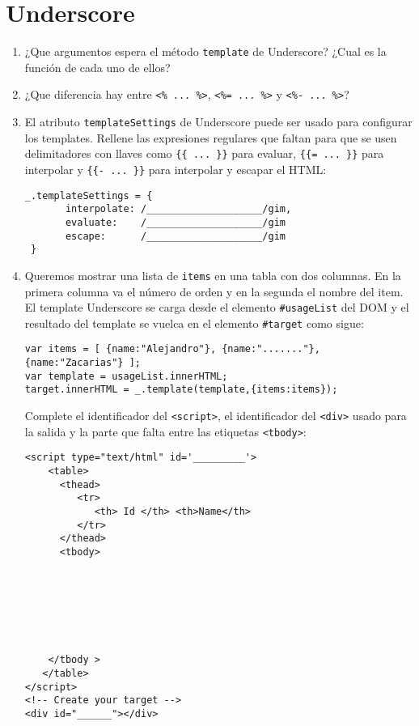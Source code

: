\documentclass[spanish,a4paper,11pt]{article}
\begin{document}
\section{Underscore}
\begin{enumerate}
\item  ¿Que argumentos espera el método \verb|template| de Underscore?
¿Cual es la función de cada uno de ellos?
\item 
¿Que diferencia hay entre \verb|<% ... %>|, \verb|<%= ... %>| y \verb|<%- ... %>|?
\item El atributo \verb|templateSettings| de Underscore puede ser usado para configurar los
templates. Rellene las expresiones regulares que faltan para que se usen delimitadores
con llaves como \verb|{{ ... }}| para evaluar, \verb|{{= ... }}| para interpolar y  
\verb|{{- ... }}| para interpolar y escapar el HTML:
\begin{verbatim}
_.templateSettings = {
       interpolate: /____________________/gim,
       evaluate:    /____________________/gim
       escape:      /____________________/gim
 }
\end{verbatim}
\item  Queremos mostrar una lista de \verb|items| en una tabla con dos columnas.
En la primera columna va el número de orden y en la segunda el nombre del 
item. El template Underscore se carga desde el elemento \verb|#usageList|
del DOM y el resultado del template se vuelca en el elemento 
\verb|#target| como sigue:
\begin{verbatim}
var items = [ {name:"Alejandro"}, {name:"......."}, {name:"Zacarias"} ];
var template = usageList.innerHTML;
target.innerHTML = _.template(template,{items:items});
\end{verbatim}
Complete el identificador del \verb|<script>|,
el identificador del \verb|<div>| usado para la salida y 
la parte que falta entre las etiquetas 
\verb|<tbody>|:
\begin{verbatim}
<script type="text/html" id='_________'>
    <table> 
      <thead> 
         <tr> 
            <th> Id </th> <th>Name</th> 
         </tr>
      </thead> 
      <tbody>







    </tbody > 
   </table>
</script>
<!-- Create your target -->
<div id="______"></div>
\end{verbatim}
\end{enumerate}
\end{document}
